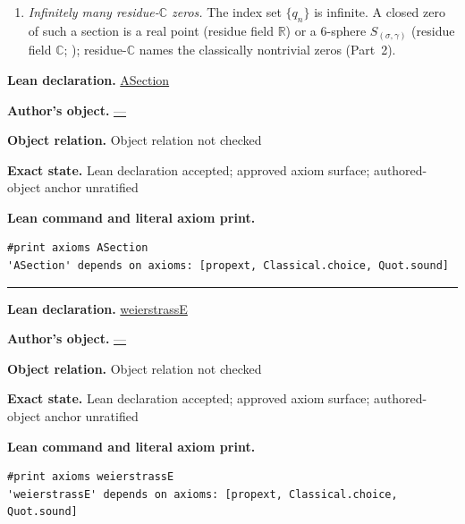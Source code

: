 \documentclass[11pt]{article}
\newcommand{\OO}{\mathbb{O}}
\newcommand{\CC}{\mathbb{C}}
\newcommand{\RR}{\mathbb{R}}
\theoremstyle{plain}
\theoremstyle{definition}
\theoremstyle{remark}
\begin{document}
\begin{tcolorbox}[provenancecard,title={44. Definition - \$A\$-sections},title after break={44. Definition - \$A\$-sections (continued)}]
\begin{enumerate}[label=\textup{(C\arabic*)},leftmargin=3.2em]
  on $\RR$, $g$ is slice-preserving entire, $\{q_n\}$ enumerates the residue-$\CC$ zero-spheres
  of $A$, and $\mathcal E(\,\cdot\,;q_n)$ is the slice-regular Weierstrass primary factor of
  $q_n$ \textup{(}Proposition~\ref{prop:weierstrass}; \cite[Prop.~3.1, Thm.~3.2]{AdFslice},
  \cite{GV}\textup{)}; the factorization holds with either family infinite, the product
  converging \emph{locally normally} on $\OO^{*}\setminus\{p_0\}$ \textup{(}the convergence of
  Proposition~\ref{prop:weierstrass}\textup{)}. \textup{(}The left
  factor makes ``full divisor'' literal: the divisor of a meromorphic section includes its
  single pole; classically, Hadamard factors $(s-1)\zeta(s)$.\textup{)}
\item \emph{Infinitely many residue-$\CC$ zeros.} The index set $\{q_n\}$ is infinite. A closed
  zero of such a section is a real point \textup{(}residue field $\RR$\textup{)} or a $6$-sphere
  $S_{(\sigma,\gamma)}$ \textup{(}residue field $\CC$; \cite{AdFslice}\textup{)}; residue-$\CC$
  names the classically nontrivial zeros \textup{(}Part~2\textup{)}.
\end{enumerate}
\tcblower
\textbf{Lean declaration.} \url{ASection}
\par\textbf{Author's object.} \url{—}
\par\textbf{Object relation.} Object relation not checked
\par\textbf{Exact state.} Lean declaration accepted; approved axiom surface; authored-object anchor unratified
\par\smallskip\textbf{Lean command and literal axiom print.}
\begin{Verbatim}[breaklines=true,breakanywhere=true,fontsize=\small]
#print axioms ASection
'ASection' depends on axioms: [propext, Classical.choice, Quot.sound]
\end{Verbatim}
\medskip\hrule\medskip
\textbf{Lean declaration.} \url{weierstrassE}
\par\textbf{Author's object.} \url{—}
\par\textbf{Object relation.} Object relation not checked
\par\textbf{Exact state.} Lean declaration accepted; approved axiom surface; authored-object anchor unratified
\par\smallskip\textbf{Lean command and literal axiom print.}
\begin{Verbatim}[breaklines=true,breakanywhere=true,fontsize=\small]
#print axioms weierstrassE
'weierstrassE' depends on axioms: [propext, Classical.choice, Quot.sound]
\end{Verbatim}

\end{tcolorbox}
\end{document}

